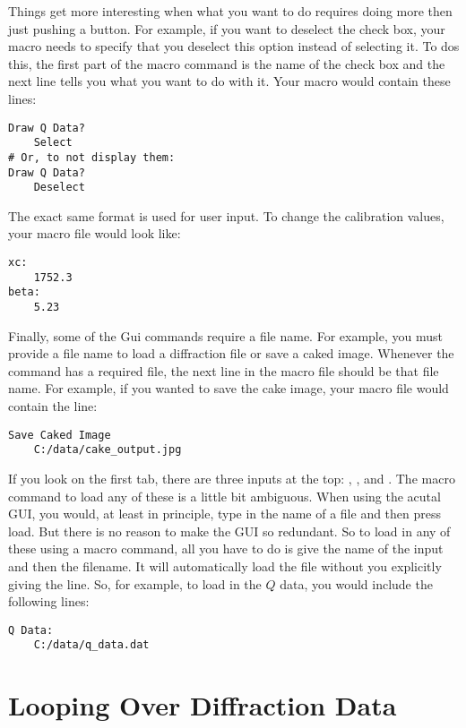 Things get more interesting when what you want to do
requires doing more then just pushing a button. For 
example, if you want to deselect the  
check box, your macro needs to specify that you deselect
this option instead of selecting it. To dos this, the 
first part of the macro command is the name of the
check box  and the next line tells
you what you want to do with it. Your macro would
contain these lines:
\begin{lstlisting}[caption={'Draw the $Q$ Lines on the Display'}]
Draw Q Data?
    Select
# Or, to not display them:
Draw Q Data?
    Deselect
\end{lstlisting}
The exact same format is used for user input. To change
the calibration values, your macro file would look like:
\begin{lstlisting}[caption={'Input a Number'}]
xc:
    1752.3
beta:
    5.23
\end{lstlisting}
Finally, some of the Gui commands require a file name.
For example, you must provide a file name to load a 
diffraction file or save a caked image. Whenever the
command has a required file, the next line in the macro 
file should be that file name. For example, if you wanted 
to save the cake image, your macro file would contain the 
line: 
\begin{lstlisting}[caption={'Save the Caked Image'}]
Save Caked Image
    C:/data/cake_output.jpg
\end{lstlisting}

If you look on the first tab, there are three inputs
at the top:
, , and 
. The macro command to load any of these
is a little bit ambiguous. When using the acutal GUI, 
you would, at least in principle, type in the name of
a file and then press load. But there is no reason to
make the GUI so redundant. So to load in any of these
using a macro command, all you have to do is give the 
name of the input and then the filename. It will 
automatically load the file without you explicitly
giving the  line. So, for example,
to load in the $Q$ data, you would include the 
following lines:
\begin{lstlisting}[caption={'Load the $Q$ Data'}]
Q Data:
    C:/data/q_data.dat
\end{lstlisting}

\section{Looping Over Diffraction Data}
\label{LoopOverDiffractionData}

